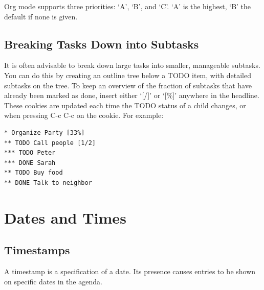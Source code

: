 Org mode supports three priorities: ‘A’, ‘B’, and ‘C’. ‘A’ is the highest, ‘B’ the default if none is given.

\begin{table}[!ht]
  \caption{Priorities}
\end{table}

\subsection{Breaking Tasks Down into Subtasks}
It is often advisable to break down large tasks into smaller, manageable subtasks. You can do this by creating an outline tree below a TODO item, with detailed subtasks on the tree. To keep an overview of the fraction of subtasks that have already been marked as done, insert either ‘[/]’ or ‘[\%]’ anywhere in the headline. These cookies are updated each time the TODO status of a child changes, or when pressing C-c C-c on the cookie. For example:

\begin{tcolorbox}
\begin{verbatim}
* Organize Party [33%]
** TODO Call people [1/2]
*** TODO Peter
*** DONE Sarah
** TODO Buy food
** DONE Talk to neighbor
\end{verbatim}
\end{tcolorbox}

\section{Dates and Times}
\subsection{Timestamps}
A timestamp is a specification of a date. Its presence causes entries to be shown on specific dates in the agenda.

